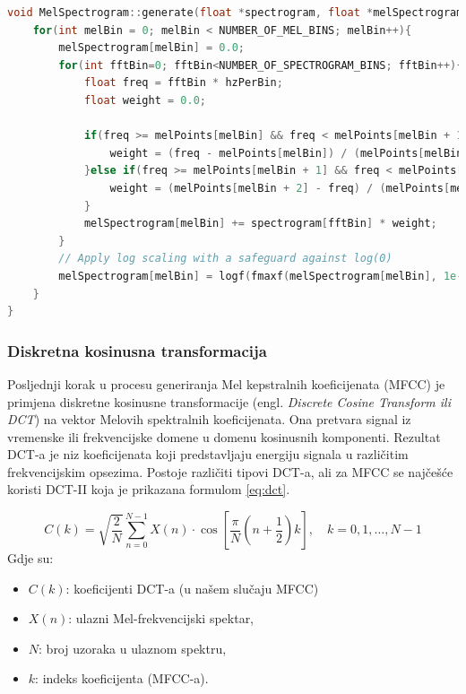 \begin{lstlisting}[language=C++, caption=FFT, label=code:mel]
void MelSpectrogram::generate(float *spectrogram, float *melSpectrogram){
    for(int melBin = 0; melBin < NUMBER_OF_MEL_BINS; melBin++){
        melSpectrogram[melBin] = 0.0;
        for(int fftBin=0; fftBin<NUMBER_OF_SPECTROGRAM_BINS; fftBin++){
            float freq = fftBin * hzPerBin;
            float weight = 0.0;

            if(freq >= melPoints[melBin] && freq < melPoints[melBin + 1]){
                weight = (freq - melPoints[melBin]) / (melPoints[melBin + 1] - melPoints[melBin]);
            }else if(freq >= melPoints[melBin + 1] && freq < melPoints[melBin + 2]){
                weight = (melPoints[melBin + 2] - freq) / (melPoints[melBin + 2] - melPoints[melBin + 1]);
            }
            melSpectrogram[melBin] += spectrogram[fftBin] * weight;
        }
        // Apply log scaling with a safeguard against log(0)
        melSpectrogram[melBin] = logf(fmaxf(melSpectrogram[melBin], 1e-6));
    }
}
\end{lstlisting}

\subsubsection{Diskretna kosinusna transformacija}

Posljednji korak u procesu generiranja Mel kepstralnih koeficijenata (MFCC) je primjena diskretne
kosinusne transformacije (engl. \textit{Discrete Cosine Transform ili DCT}) na vektor Melovih spektralnih
koeficijenata. Ona pretvara signal iz vremenske ili frekvencijske domene u 
domenu kosinusnih komponenti. Rezultat DCT-a je niz koeficijenata koji predstavljaju energiju 
signala u različitim frekvencijskim opsezima. 
Postoje različiti tipovi DCT-a, ali za MFCC se najčešće koristi DCT-II koja je prikazana
formulom \ref{eq:dct}.

\begin{equation}
    \label{eq:dct}
    C(k) = \sqrt{\frac{2}{N}} \sum_{n=0}^{N-1} X(n) \cdot \cos\left[ \frac{\pi}{N} \left(n + \frac{1}{2}\right) k \right], \quad k = 0, 1, \dots, N-1
\end{equation}
Gdje su:
\begin{itemize}
\item $C(k)$: koeficijenti DCT-a (u našem slučaju MFCC)
\item $X(n)$: ulazni Mel-frekvencijski spektar,
\item $N$: broj uzoraka u ulaznom spektru,
\item $k$: indeks koeficijenta (MFCC-a).
\end{itemize}

